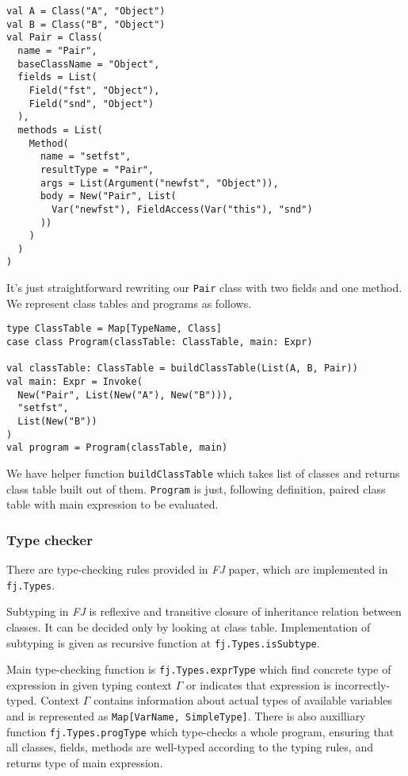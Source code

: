 \documentclass{article}[12pt]
\begin{document}
\begin{verbatim}
val A = Class("A", "Object")
val B = Class("B", "Object")
val Pair = Class(
  name = "Pair",
  baseClassName = "Object",
  fields = List(
    Field("fst", "Object"),
    Field("snd", "Object")
  ),
  methods = List(
    Method(
      name = "setfst",
      resultType = "Pair",
      args = List(Argument("newfst", "Object")),
      body = New("Pair", List(
        Var("newfst"), FieldAccess(Var("this"), "snd")
      ))
    )
  )
)
\end{verbatim}
It's just straightforward rewriting our \texttt{Pair} class
with two fields and one method. We represent class tables and
programs as follows.

\begin{verbatim}
type ClassTable = Map[TypeName, Class]
case class Program(classTable: ClassTable, main: Expr)

val classTable: ClassTable = buildClassTable(List(A, B, Pair))
val main: Expr = Invoke(
  New("Pair", List(New("A"), New("B"))),
  "setfst",
  List(New("B"))
)
val program = Program(classTable, main)
\end{verbatim}

We have helper function \texttt{buildClassTable} which takes list
of classes and returns class table built out of them.
\texttt{Program} is just, following definition, paired class table
with main expression to be evaluated.

\subsubsection{Type checker}

There are type-checking rules provided in \emph{FJ} paper, which
are implemented in \texttt{fj.Types}.

Subtyping in \emph{FJ} is reflexive and transitive closure of
inheritance relation between classes. It can be decided only by
looking at class table. Implementation of subtyping is given as
recursive function at \texttt{fj.Types.isSubtype}.

Main type-checking function is \texttt{fj.Types.exprType} which
find concrete type of expression in given typing context $\Gamma$
or indicates that expression is incorrectly-typed. Context
$\Gamma$ contains information about actual types of available
variables and is represented as \texttt{Map[VarName, SimpleType]}.
There is also auxilliary function \texttt{fj.Types.progType} which
type-checks a whole program, ensuring that all classes, fields,
methods are well-typed according to the typing rules, and returns
type of main expression.
\end{document}
